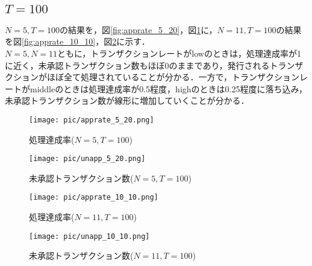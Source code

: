 \documentclass[japanese, macos]{KU2}
\begin{document}
\subsection{$T = 100$}
$N=5,T = 100$の結果を，図\ref{fig:apprate_5_20}，図\ref{fig:unapp_5_20}に，$N=11,T = 100$の結果を図\ref{fig:apprate_10_10}，図\ref{fig:unapp_10_10}に示す．\\
$N=5,N=11$ともに，トランザクションレートがlowのときは，処理達成率が1に近く，未承認トランザクション数もほぼ0のままであり，発行されるトランザクションがほぼ全て処理されていることが分かる．一方で，トランザクションレートがmiddleのときは処理達成率が0.5程度，highのときは0.25程度に落ち込み，未承認トランザクション数が線形に増加していくことが分かる．
\begin{figure}[htbp]
 \begin{minipage}{0.5\hsize}
  \begin{center}
   \texttt{[image: pic/apprate\_5\_20.png]}
  \end{center}
  \caption{処理達成率($N=5,T=100$)}
  \label{fig:apprate_5_20}
 \end{minipage}
 \begin{minipage}{0.5\hsize}
  \begin{center}
   \texttt{[image: pic/unapp\_5\_20.png]}
  \end{center}
  \caption{未承認トランザクション数($N=5,T=100$)}
  \label{fig:unapp_5_20}
 \end{minipage}
\end{figure}

\begin{figure}[htbp]
 \begin{minipage}{0.5\hsize}
  \begin{center}
   \texttt{[image: pic/apprate\_10\_10.png]}
  \end{center}
  \caption{処理達成率($N=11,T=100$)}
  \label{fig:apprate_10_10}
 \end{minipage}
 \begin{minipage}{0.5\hsize}
  \begin{center}
   \texttt{[image: pic/unapp\_10\_10.png]}
  \end{center}
  \caption{未承認トランザクション数($N=11,T=100$)}
  \label{fig:unapp_10_10}
 \end{minipage}
\end{figure}
\end{document}
